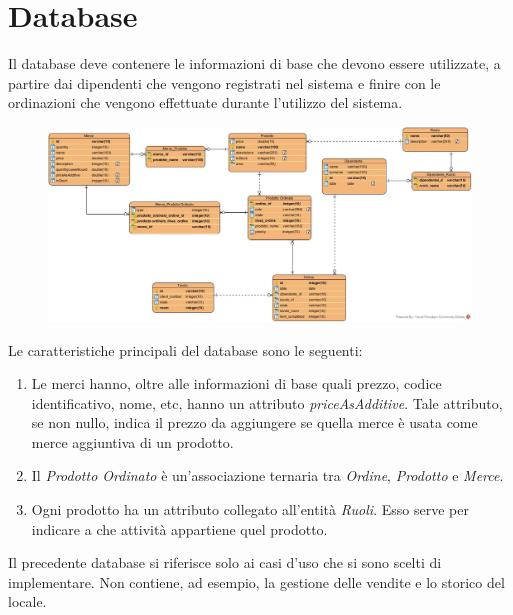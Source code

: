 \section{Database}
Il database deve contenere le informazioni di base che devono essere utilizzate, a partire dai dipendenti che vengono registrati nel sistema e finire con le ordinazioni che vengono effettuate durante l'utilizzo del sistema.
\begin{figure}[H]
	\centering
	\includegraphics[width=1\textwidth]{Immagini/database.jpg}
\end{figure}
Le caratteristiche principali del database sono le seguenti:
\begin{enumerate}
	\item Le merci hanno, oltre alle informazioni di base quali prezzo, codice identificativo, nome, etc, hanno un attributo \textit{priceAsAdditive}. Tale attributo, se non nullo, indica il prezzo da aggiungere se quella merce è usata come merce aggiuntiva di un prodotto.
	\item Il \textit{Prodotto Ordinato} è un'associazione ternaria tra \textit{Ordine}, \textit{Prodotto} e \textit{Merce}.
	 \item Ogni prodotto ha un attributo collegato all'entità \textit{Ruoli}. Esso serve per indicare a che attività appartiene quel prodotto.
\end{enumerate}
Il precedente database si riferisce solo ai casi d'uso che si sono scelti di implementare. Non contiene, ad esempio, la gestione delle vendite e lo storico del locale.

